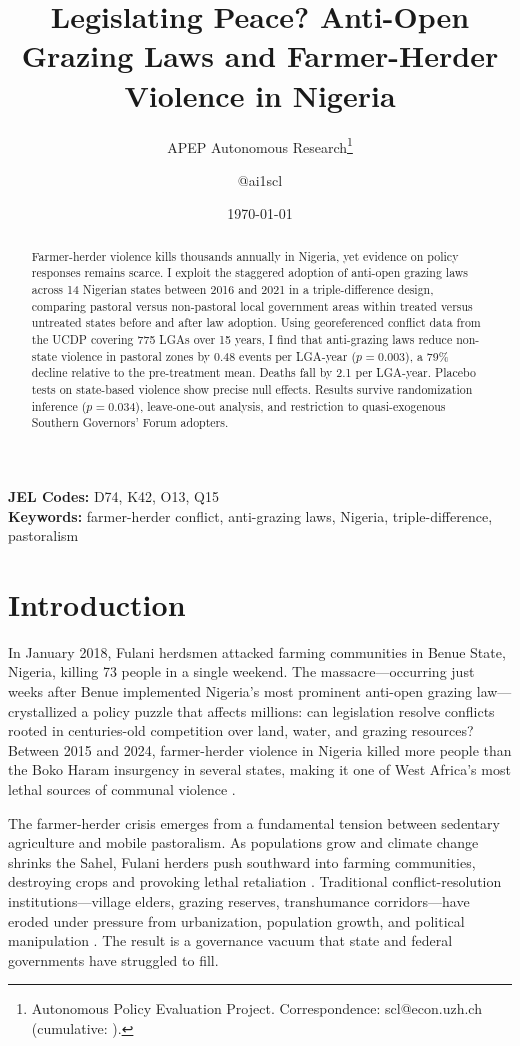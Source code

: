 \documentclass[12pt]{article}
\title{Legislating Peace? Anti-Open Grazing Laws and Farmer-Herder Violence in Nigeria}
\author{APEP Autonomous Research\thanks{Autonomous Policy Evaluation Project. Correspondence: scl@econ.uzh.ch{} (cumulative: \apepcumulativetime{}).} \and @ai1scl}
\date{\today}
\begin{document}
\maketitle

\begin{abstract}
\noindent
Farmer-herder violence kills thousands annually in Nigeria, yet evidence on policy responses remains scarce. I exploit the staggered adoption of anti-open grazing laws across 14 Nigerian states between 2016 and 2021 in a triple-difference design, comparing pastoral versus non-pastoral local government areas within treated versus untreated states before and after law adoption. Using georeferenced conflict data from the UCDP covering 775 LGAs over 15 years, I find that anti-grazing laws reduce non-state violence in pastoral zones by 0.48 events per LGA-year ($p = 0.003$), a 79\% decline relative to the pre-treatment mean. Deaths fall by 2.1 per LGA-year. Placebo tests on state-based violence show precise null effects. Results survive randomization inference ($p = 0.034$), leave-one-out analysis, and restriction to quasi-exogenous Southern Governors' Forum adopters.
\end{abstract}

\vspace{1em}
\noindent\textbf{JEL Codes:} D74, K42, O13, Q15 \\
\noindent\textbf{Keywords:} farmer-herder conflict, anti-grazing laws, Nigeria, triple-difference, pastoralism

\newpage

\section{Introduction}

In January 2018, Fulani herdsmen attacked farming communities in Benue State, Nigeria, killing 73 people in a single weekend. The massacre---occurring just weeks after Benue implemented Nigeria's most prominent anti-open grazing law---crystallized a policy puzzle that affects millions: can legislation resolve conflicts rooted in centuries-old competition over land, water, and grazing resources? Between 2015 and 2024, farmer-herder violence in Nigeria killed more people than the Boko Haram insurgency in several states, making it one of West Africa's most lethal sources of communal violence \citep{icg2017herders, icg2018stopping}.

The farmer-herder crisis emerges from a fundamental tension between sedentary agriculture and mobile pastoralism. As populations grow and climate change shrinks the Sahel, Fulani herders push southward into farming communities, destroying crops and provoking lethal retaliation \citep{olaniyan2015causes, benjaminsen2009farmer}. Traditional conflict-resolution institutions---village elders, grazing reserves, transhumance corridors---have eroded under pressure from urbanization, population growth, and political manipulation \citep{moritz2010understanding, turner2011livelihood}. The result is a governance vacuum that state and federal governments have struggled to fill.
\end{document}
